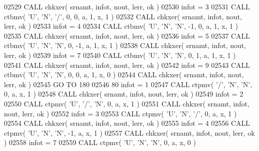 \begin{DoxyCode}
02529       \textcolor{keyword}{CALL }chkxer( srnamt, infot, nout, lerr, ok )
02530       infot = 3
02531       \textcolor{keyword}{CALL }ctbmv( \textcolor{stringliteral}{'U'}, \textcolor{stringliteral}{'N'}, \textcolor{stringliteral}{'/'}, 0, 0, a, 1, x, 1 )
02532       \textcolor{keyword}{CALL }chkxer( srnamt, infot, nout, lerr, ok )
02533       infot = 4
02534       \textcolor{keyword}{CALL }ctbmv( \textcolor{stringliteral}{'U'}, \textcolor{stringliteral}{'N'}, \textcolor{stringliteral}{'N'}, -1, 0, a, 1, x, 1 )
02535       \textcolor{keyword}{CALL }chkxer( srnamt, infot, nout, lerr, ok )
02536       infot = 5
02537       \textcolor{keyword}{CALL }ctbmv( \textcolor{stringliteral}{'U'}, \textcolor{stringliteral}{'N'}, \textcolor{stringliteral}{'N'}, 0, -1, a, 1, x, 1 )
02538       \textcolor{keyword}{CALL }chkxer( srnamt, infot, nout, lerr, ok )
02539       infot = 7
02540       \textcolor{keyword}{CALL }ctbmv( \textcolor{stringliteral}{'U'}, \textcolor{stringliteral}{'N'}, \textcolor{stringliteral}{'N'}, 0, 1, a, 1, x, 1 )
02541       \textcolor{keyword}{CALL }chkxer( srnamt, infot, nout, lerr, ok )
02542       infot = 9
02543       \textcolor{keyword}{CALL }ctbmv( \textcolor{stringliteral}{'U'}, \textcolor{stringliteral}{'N'}, \textcolor{stringliteral}{'N'}, 0, 0, a, 1, x, 0 )
02544       \textcolor{keyword}{CALL }chkxer( srnamt, infot, nout, lerr, ok )
02545       \textcolor{keywordflow}{GO TO} 180
02546    80 infot = 1
02547       \textcolor{keyword}{CALL }ctpmv( \textcolor{stringliteral}{'/'}, \textcolor{stringliteral}{'N'}, \textcolor{stringliteral}{'N'}, 0, a, x, 1 )
02548       \textcolor{keyword}{CALL }chkxer( srnamt, infot, nout, lerr, ok )
02549       infot = 2
02550       \textcolor{keyword}{CALL }ctpmv( \textcolor{stringliteral}{'U'}, \textcolor{stringliteral}{'/'}, \textcolor{stringliteral}{'N'}, 0, a, x, 1 )
02551       \textcolor{keyword}{CALL }chkxer( srnamt, infot, nout, lerr, ok )
02552       infot = 3
02553       \textcolor{keyword}{CALL }ctpmv( \textcolor{stringliteral}{'U'}, \textcolor{stringliteral}{'N'}, \textcolor{stringliteral}{'/'}, 0, a, x, 1 )
02554       \textcolor{keyword}{CALL }chkxer( srnamt, infot, nout, lerr, ok )
02555       infot = 4
02556       \textcolor{keyword}{CALL }ctpmv( \textcolor{stringliteral}{'U'}, \textcolor{stringliteral}{'N'}, \textcolor{stringliteral}{'N'}, -1, a, x, 1 )
02557       \textcolor{keyword}{CALL }chkxer( srnamt, infot, nout, lerr, ok )
02558       infot = 7
02559       \textcolor{keyword}{CALL }ctpmv( \textcolor{stringliteral}{'U'}, \textcolor{stringliteral}{'N'}, \textcolor{stringliteral}{'N'}, 0, a, x, 0 )

\end{DoxyCode}
